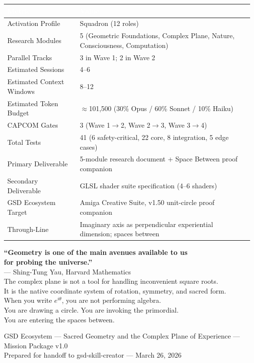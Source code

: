 \documentclass[11pt,letterpaper]{article}
\newcommand{\tableheader}[1]{\textbf{\sffamily\textcolor{white}{#1}}}
\begin{document}
\begin{center}
\begin{tabularx}{\textwidth}{L{4.5cm}X}
\toprule
{}
\tableheader{Metric} & \tableheader{Value} \\
\midrule
Activation Profile & Squadron (12 roles) \\
Research Modules & 5 (Geometric Foundations, Complex Plane, Nature, Consciousness, Computation) \\
Parallel Tracks & 3 in Wave 1; 2 in Wave 2 \\
Estimated Sessions & 4--6 \\
Estimated Context Windows & 8--12 \\
Estimated Token Budget & $\approx$101,500 (30\% Opus / 60\% Sonnet / 10\% Haiku) \\
CAPCOM Gates & 3 (Wave 1$\to$2, Wave 2$\to$3, Wave 3$\to$4) \\
Total Tests & 41 (6 safety-critical, 22 core, 8 integration, 5 edge cases) \\
Primary Deliverable & 5-module research document + Space Between proof companion \\
Secondary Deliverable & GLSL shader suite specification (4--6 shaders) \\
GSD Ecosystem Target & Amiga Creative Suite, v1.50 unit-circle proof companion \\
Through-Line & Imaginary axis as perpendicular experiential dimension; spaces between \\
\bottomrule
\end{tabularx}
\end{center}

\vspace{2em}

\begin{quotebox}
\begin{center}
{\large\sffamily\textcolor{primary}{\textbf{``Geometry is one of the main avenues available to us\\for probing the universe.''}}}\\[0.8em]
{\normalsize\sffamily\textcolor{secondary}{--- Shing-Tung Yau, Harvard Mathematics}}\\[1.2em]
{\normalsize\sffamily\textcolor{darktext}{
The complex plane is not a tool for handling inconvenient square roots.\\
It is the native coordinate system of rotation, symmetry, and sacred form.\\
When you write $e^{i\theta}$, you are not performing algebra.\\
You are drawing a circle. You are invoking the primordial.\\
You are entering the spaces between.
}}
\end{center}
\end{quotebox}

\vspace{1em}

\begin{center}
{\small\sffamily\textcolor{subtlegray}{GSD Ecosystem --- Sacred Geometry and the Complex Plane of Experience --- Mission Package v1.0}}\\
{\small\sffamily\textcolor{subtlegray}{Prepared for handoff to gsd-skill-creator --- March 26, 2026}}
\end{center}
\end{document}
